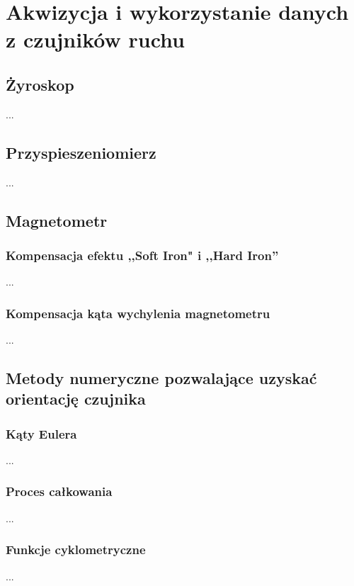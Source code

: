 \chapter{Akwizycja i wykorzystanie danych z czujników ruchu}

\section{Żyroskop}
...

\section{Przyspieszeniomierz}
...

\section{Magnetometr}

\subsection{Kompensacja efektu ,,Soft Iron" i ,,Hard Iron''}
...

\subsection{Kompensacja kąta wychylenia magnetometru}
...
\section{Metody numeryczne pozwalające uzyskać orientację czujnika}

\subsection{Kąty Eulera}
...

\subsection{Proces całkowania}
...

\subsection{Funkcje cyklometryczne}
...